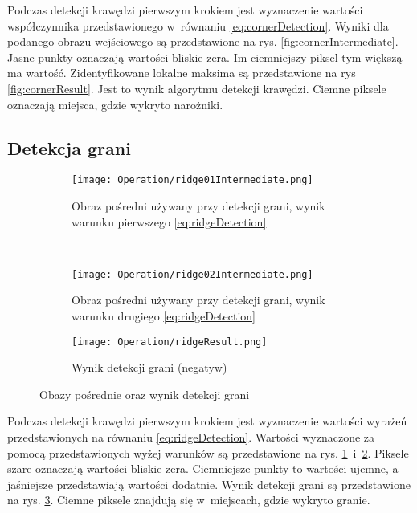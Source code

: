 Podczas detekcji krawędzi pierwszym krokiem jest wyznaczenie wartości współczynnika przedstawionego w~równaniu \eqref{eq:cornerDetection}. Wyniki dla podanego obrazu wejściowego są przedstawione na rys. \ref{fig:cornerIntermediate}. Jasne punkty oznaczają wartości bliskie zera. Im ciemniejszy piksel tym większą ma wartość. Zidentyfikowane lokalne maksima są przedstawione na rys \ref{fig:cornerResult}. Jest to wynik algorytmu detekcji krawędzi. Ciemne piksele oznaczają miejsca, gdzie wykryto narożniki.

\subsection{Detekcja grani}
\label{sec:dzialanieRidge}

\begin{figure}[h]
\begin{center}

\begin{subfigure}[t]{0.3\textwidth}
\texttt{[image: Operation/ridge01Intermediate.png]}
\caption{Obraz pośredni używany przy detekcji grani, wynik warunku pierwszego \eqref{eq:ridgeDetection}}
\label{fig:ridgeIntermediate1}
\end{subfigure}
~
\begin{subfigure}[t]{0.3\textwidth}
\texttt{[image: Operation/ridge02Intermediate.png]}
\caption{Obraz pośredni używany przy detekcji grani, wynik warunku drugiego \eqref{eq:ridgeDetection}}
\label{fig:ridgeIntermediate2}
\end{subfigure}

\begin{subfigure}[t]{0.3\textwidth}
\texttt{[image: Operation/ridgeResult.png]}
\caption{Wynik detekcji grani (negatyw)}
\label{fig:ridgeResult}
\end{subfigure}

\end{center}
\label{fig:showEdge}
\caption{Obazy pośrednie oraz wynik detekcji grani}
\end{figure}

Podczas detekcji krawędzi pierwszym krokiem jest wyznaczenie wartości wyrażeń przedstawionych na równaniu \eqref{eq:ridgeDetection}. Wartości wyznaczone za pomocą przedstawionych wyżej warunków są przedstawione na rys. \ref{fig:ridgeIntermediate1}~i~\ref{fig:ridgeIntermediate2}. Piksele szare oznaczają wartości bliskie zera. Ciemniejsze punkty to wartości ujemne, a jaśniejsze przedstawiają wartości dodatnie. Wynik detekcji grani są przedstawione na rys. \ref{fig:ridgeResult}. Ciemne piksele znajdują się w~miejscach, gdzie wykryto granie.
